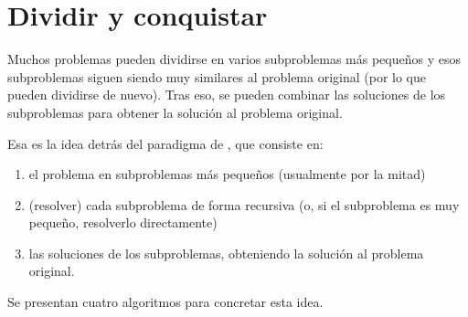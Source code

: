 \section{Dividir y conquistar}
\label{sec:dividir-y-conquistar}

Muchos problemas pueden dividirse en varios subproblemas más pequeños y esos subproblemas siguen siendo muy similares al problema original (por lo que pueden dividirse de nuevo). Tras eso, se pueden combinar las soluciones de los subproblemas para obtener la solución al problema original.

Esa es la idea detrás del paradigma de , que consiste en:
\begin{enumerate}
    \item {} el problema en subproblemas más pequeños (usualmente por la mitad)
    \item {} (resolver) cada subproblema de forma recursiva (o, si el subproblema es muy pequeño, resolverlo directamente)
    \item {} las soluciones de los subproblemas, obteniendo la solución al problema original.
\end{enumerate}

Se presentan cuatro algoritmos para concretar esta idea.


\begin{ejercicios}
\end{ejercicios}
